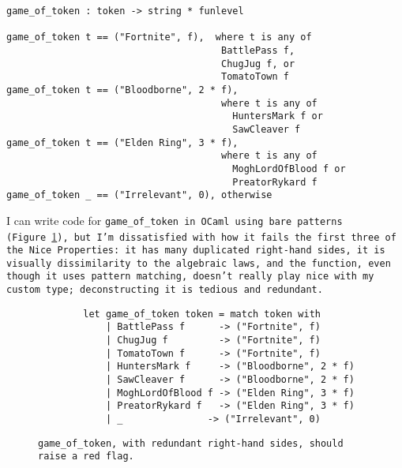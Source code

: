 \documentclass[manuscript,screen,review, 12pt, nonacm]{acmart}
\begin{document}
\begin{outline}[enumerate]
\begin{minipage}[t]{\textwidth}
\begin{verbatim}
game_of_token : token -> string * funlevel

game_of_token t == ("Fortnite", f),  where t is any of 
                                      BattlePass f, 
                                      ChugJug f, or
                                      TomatoTown f
game_of_token t == ("Bloodborne", 2 * f), 
                                      where t is any of 
                                        HuntersMark f or 
                                        SawCleaver f
game_of_token t == ("Elden Ring", 3 * f), 
                                      where t is any of 
                                        MoghLordOfBlood f or  
                                        PreatorRykard f
game_of_token _ == ("Irrelevant", 0), otherwise
    \end{verbatim}
\end{minipage}        
        
        I can write code for \tt{game\_of\_token} in OCaml using bare patterns
        (Figure~\ref{fig:baregot}), but I'm dissatisfied with how it fails the
        first three of the Nice Properties: it has many duplicated right-hand
        sides, it is visually dissimilarity to the algebraic laws, and the
        function, even though it uses pattern matching, doesn't really play nice
        with my custom type; deconstructing it is tedious and redundant.         
        
        \begin{figure}
            \begin{center}
                \begin{verbatim}
        let game_of_token token = match token with 
            | BattlePass f      -> ("Fortnite", f)
            | ChugJug f         -> ("Fortnite", f)
            | TomatoTown f      -> ("Fortnite", f)
            | HuntersMark f     -> ("Bloodborne", 2 * f)
            | SawCleaver f      -> ("Bloodborne", 2 * f)
            | MoghLordOfBlood f -> ("Elden Ring", 3 * f)
            | PreatorRykard f   -> ("Elden Ring", 3 * f)
            | _               -> ("Irrelevant", 0)
                \end{verbatim}
            \end{center}    

        \caption{\tt{game\_of\_token}, with redundant right-hand sides,
        should raise a red flag.} 
        \label{fig:baregot}
        \end{figure}


\end{outline}
\end{document}
